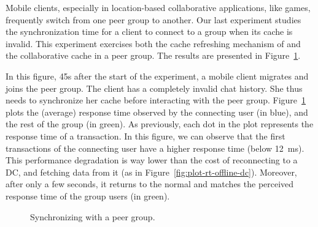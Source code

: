 
Mobile clients, especially in location-based collaborative applications, 
like games,
frequently switch from one peer group to another.
Our last experiment studies the synchronization time for a client to connect to 
a group when its cache is invalid.
This experiment exercises both the cache refreshing mechanism of \system{} and 
the collaborative cache in a peer group.
The results are presented in Figure~\ref{fig:plot-sync-time}.

In this figure, 45s after the start of the experiment, a mobile client migrates 
and joins the peer group.
The client has a completely invalid chat history.
She thus needs to synchronize her cache before interacting with the peer group.
Figure~\ref{fig:plot-sync-time} plots the (average) response time observed by 
the connecting user (in blue), and the rest of the group (in green).
As previously, each dot in the plot represents the response time of a transaction.
In this figure, we can observe that the first transactions of the connecting 
user have a higher response time (below 12~ms).
This performance degradation is way lower than the cost of reconnecting to a DC, 
and fetching data from it (as in Figure~\ref{fig:plot-rt-offline-dc}).
Moreover, after only a few seconds, it returns to the normal and matches the 
perceived response time of the group users (in green).

\begin{figure}
\begin{center}
    \scalebox{0.7}{}
\end{center}
\caption{Synchronizing with a peer group.}
\label{fig:plot-sync-time}
\end{figure}
